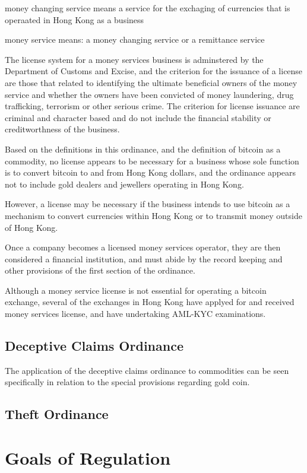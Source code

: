 money changing service means a service for the exchaging of currencies
that is operaated in Hong Kong as a business 

money service means: a money changing service or a remittance service

The license system for a money services business is adminstered by the
Department of Customs and Excise, and the criterion for the issuance
of a license are those that related to identifying the ultimate
beneficial owners of the money service and whether the owners have
been convicted of money laundering, drug trafficking, terrorism or
other serious crime.  The criterion for license issuance are criminal
and character based and do not include the financial stability or
creditworthness of the business.

Based on the definitions in this ordinance, and the definition of
bitcoin as a commodity, no license appears to be necessary for a
business whose sole function is to convert bitcoin to and from Hong
Kong dollars, and the ordinance appears not to include gold dealers
and jewellers operating in Hong Kong.

However, a license may be necessary if the business intends to use
bitcoin as a mechanism to convert currencies within Hong Kong or to
transmit money outside of Hong Kong.

Once a company becomes a licensed money services operator, they are
then considered a financial institution, and must abide by the record
keeping and other provisions of the first section of the ordinance.

Although a money service license is not essential for operating a
bitcoin exchange, several of the exchanges in Hong Kong have applyed
for and received money services license, and have undertaking AML-KYC
examinations. 

\subsection{Deceptive Claims Ordinance}

The application of the deceptive claims ordinance to commodities can
be seen specifically in relation to the special provisions regarding
gold coin.

\subsection{Theft Ordinance}

\section{Goals of Regulation}

